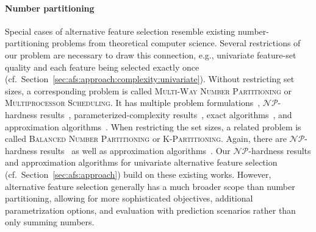 \paragraph{Number partitioning}

Special cases of alternative feature selection resemble existing number-partitioning problems from theoretical computer science.
Several restrictions of our problem are necessary to draw this connection, e.g., univariate feature-set quality and each feature being selected exactly once (cf.~Section~\ref{sec:afs:approach:complexity:univariate}).
Without restricting set sizes, a corresponding problem is called \textsc{Multi-Way Number Partitioning} or \textsc{Multiprocessor Scheduling}.
It has multiple problem formulations~\cite{garey2003computers, korf2010objective, lawrinenko2017identical}, $\mathcal{NP}$-hardness results~\cite{garey2003computers, korf2009multi}, parameterized-complexity results~\cite{mnich2018parameterized}, exact algorithms~\cite{haouari2008maximizing, schreiber2018optimal, walter2017improved}, and approximation algorithms~\cite{alon1998approximation, deuermeyer1982scheduling, sahni1976algorithms, woeginger1997polynomial}.
When restricting the set sizes, a related problem is called \textsc{Balanced Number Partitioning} or \textsc{K-Partitioning}.
Again, there are $\mathcal{NP}$-hardness results~\cite{babel1998thek, he2003kappa} as well as approximation algorithms~\cite{chen2016efficient, kellerer2011a32approximation, lawrinenko2018reduction, michiels2012computer, zhang2011heuristic}.
Our $\mathcal{NP}$-hardness results and approximation algorithms for univariate alternative feature selection (cf.~Section~\ref{sec:afs:approach}) build on these existing works.
However, alternative feature selection generally has a much broader scope than number partitioning, allowing for more sophisticated objectives, additional parametrization options, and evaluation with prediction scenarios rather than only summing numbers.
